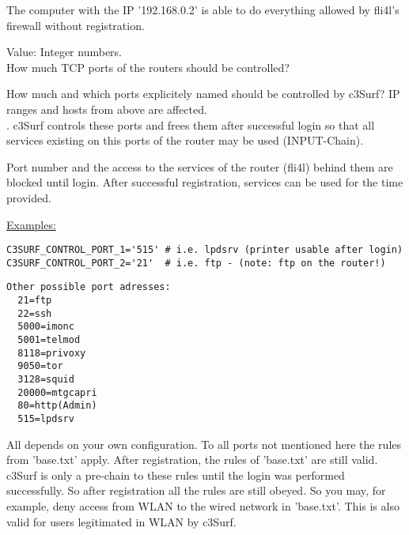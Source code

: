 \begin{itemize}
\begin{description}
The computer with the IP '192.168.0.2' is able to do everything
allowed by fli4l's firewall without registration.



  Value: Integer numbers.\\
  How much TCP ports of the routers should be controlled?

  How much and which ports explicitely named should be controlled by c3Surf?
  IP ranges and hosts from above are affected.\\
  . c3Surf
  controls these ports and frees them after successful login so that all services
  existing on this ports of the router may be used (INPUT-Chain).



  Port number and the access to the services of the router (fli4l) behind them
  are blocked until login. After successful registration, services can be used for
  the time provided.

\underline{Examples:}
\begin{example}
\begin{verbatim}
C3SURF_CONTROL_PORT_1='515' # i.e. lpdsrv (printer usable after login)
C3SURF_CONTROL_PORT_2='21'  # i.e. ftp - (note: ftp on the router!)
\end{verbatim}
\end{example}

\begin{example}
\begin{verbatim}
Other possible port adresses:
  21=ftp
  22=ssh
  5000=imonc
  5001=telmod
  8118=privoxy
  9050=tor
  3128=squid
  20000=mtgcapri
  80=http(Admin)
  515=lpdsrv
\end{verbatim}
\end{example}

All depends on your own configuration. To all ports not mentioned here
the rules from 'base.txt' apply. After registration, the rules of 'base.txt'
are still valid. c3Surf is only a pre-chain to these rules until the login
was performed successfully. So after registration all the rules are still
obeyed. So you may, for example, deny access from WLAN to the wired network
in 'base.txt'. This is also valid for users legitimated in WLAN by c3Surf.


\end{description}
\end{itemize}
